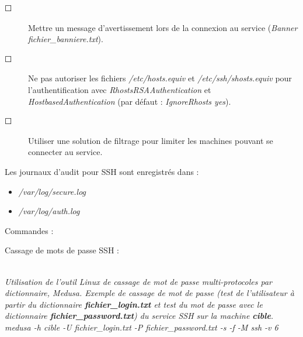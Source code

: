 \documentclass[a4paper,11pt]{article}				    %
\begin{document}
{\begin{description}
    \item[$\Square$] Mettre un message d'avertissement lors de la connexion au service  ({\sl \color{blue}Banner fichier\_banniere.txt}).
    \item[$\Square$] Ne pas autoriser les fichiers {\sl \color{blue}/etc/hosts.equiv} et {\sl \color{blue}/etc/ssh/shosts.equiv} pour l'authentification avec {\sl \color{blue}RhostsRSAAuthentication} et {\sl \color{blue}HostbasedAuthentication} (par d\'efaut : {\sl \color{blue}IgnoreRhosts yes}).
    \item[$\Square$] Utiliser une solution de filtrage pour limiter les machines pouvant se connecter au service.\\
\end{description}

\begin{LARGE}Les journaux d'audit pour SSH sont enregistr\'es dans :\end{LARGE}
\begin{itemize}
	\item {\sl \color{blue}/var/log/secure.log}
	\item {\sl \color{blue}/var/log/auth.log}\\
\end{itemize}

\begin{LARGE}Commandes : \end{LARGE}

\begin{LARGE}Cassage de mots de passe SSH : \end{LARGE}\\
\textit{Utilisation de l'outil Linux de cassage de mot de passe multi-protocoles par dictionnaire, Medusa. Exemple de cassage de mot de passe (test de l'utilisateur \`a partir du dictionnaire \textbf{fichier\_login.txt} et test du mot de passe avec le dictionnaire \textbf{fichier\_password.txt}) du service SSH sur la machine \textbf{cible}.}\\
{\sl \color{blue}medusa -h cible -U fichier\_login.txt -P fichier\_password.txt -s -f -M ssh -v 6}
}
\end{document}
